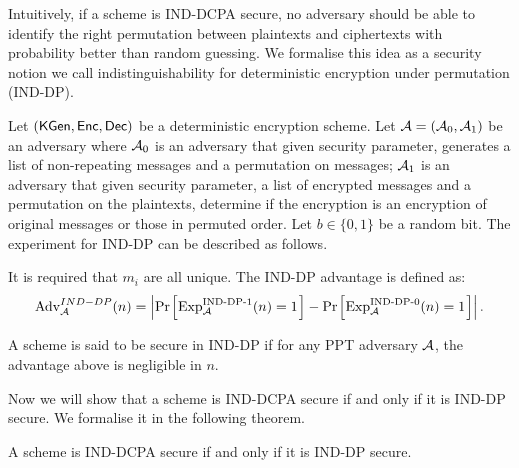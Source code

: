 Intuitively, if a scheme is IND-DCPA secure, no adversary should be able to identify the right permutation between plaintexts and ciphertexts with probability better than random guessing. We formalise this idea as a security notion we call indistinguishability for deterministic encryption under permutation (IND-DP).

\begin{definition}[IND-DP]
Let $(\mathsf{KGen}, \mathsf{Enc}, \mathsf{Dec})$ be a deterministic encryption scheme. Let $\mathcal{A} = (\mathcal{A}_0, \mathcal{A}_1)$ be an adversary where $\mathcal{A}_0$ is an adversary that given security parameter, generates a list of non-repeating messages and a permutation on messages; $\mathcal{A}_1$ is an adversary that given security parameter, a list of encrypted messages and a permutation on the plaintexts, determine if the encryption is an encryption of original messages or those in permuted order. Let $b \in \{0,1\}$ be a random bit. The experiment for IND-DP can be described as follows.

\begin{pchstack}[center]
\end{pchstack}

It is required that $m_i$ are all unique. The IND-DP advantage is defined as:
\begin{equation}
\advantage_{\adv}^{IND-DP}(n) = \left| \prob{\text{Exp}_{\adv}^{\text{IND-DP-1}}(n) = 1} - \prob{\text{Exp}_{\adv}^{\text{IND-DP-0}}(n) = 1} \right|.
\end{equation}

A scheme is said to be secure in IND-DP if for any PPT adversary $\mathcal{A}$, the advantage above is negligible in $n$.
\end{definition}


Now we will show that a scheme is IND-DCPA secure if and only if it is IND-DP secure. We formalise it in the following theorem.

\begin{theorem} \label{Theorem: IND-DCPA and IND-DP are Equivalent}
A scheme is IND-DCPA secure if and only if it is IND-DP secure.
\end{theorem}



